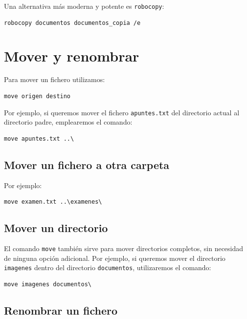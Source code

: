 \documentclass[11pt,a4paper]{article}
\begin{document}
\noindent Una alternativa más moderna y potente es \texttt{robocopy}:

\begin{lstlisting}
robocopy documentos documentos_copia /e
\end{lstlisting}

\section{Mover y renombrar}

Para mover un fichero utilizamos:

\begin{lstlisting}
move origen destino
\end{lstlisting}

\noindent Por ejemplo, si queremos mover el fichero \texttt{apuntes.txt} del directorio actual al directorio padre, emplearemos el comando:
\begin{lstlisting}
move apuntes.txt ..\
\end{lstlisting}



\subsection{Mover un fichero a otra carpeta}

Por ejemplo:

\begin{lstlisting}
move examen.txt ..\examenes\
\end{lstlisting}

\subsection{Mover un directorio}

El comando \texttt{move} también sirve para mover directorios
completos, sin necesidad de ninguna opción adicional. Por ejemplo, si queremos mover el directorio \texttt{imagenes} dentro del directorio \texttt{documentos}, utilizaremos el comando:

\begin{lstlisting}
move imagenes documentos\
\end{lstlisting}

\subsection{Renombrar un fichero}
\end{document}

